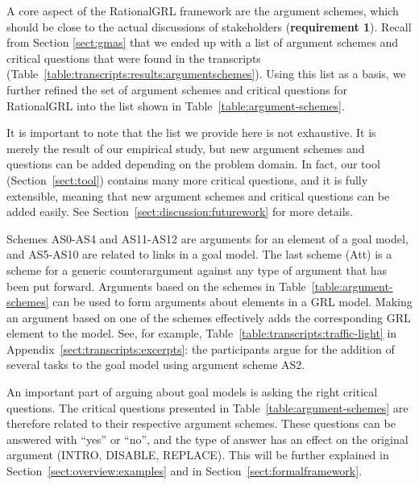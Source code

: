 A core aspect of the RationalGRL framework are the argument schemes, which should be close to the actual discussions of stakeholders (\textbf{requirement 1}). Recall from Section \ref{sect:gmas} that we ended up with a list of argument schemes and critical questions that were found in the transcripts (Table~\ref{table:transcripts:results:argumentschemes}). Using this list as a basis, we further refined the set of argument schemes and critical questions for RationalGRL into the list shown in Table~\ref{table:argument-schemes}. 

It is important to note that the list we provide here is not exhaustive. It is merely the result of our empirical study, but new argument schemes and questions can be added depending on the problem domain. In fact, our tool (Section~\ref{sect:tool}) contains many more critical questions, and it is fully extensible, meaning that new argument schemes and critical questions can be added easily. See Section~\ref{sect:discussion:futurework} for more details.

Schemes AS0-AS4 and AS11-AS12 are arguments for an element of a goal model, and AS5-AS10 are related to links in a goal model. The last scheme (Att) is a scheme for a generic counterargument against any type of argument that has been put forward. Arguments based on the schemes in Table~\ref{table:argument-schemes} can be used to form arguments about elements in a GRL model. Making an argument based on one of the schemes effectively adds the corresponding GRL element to the model. See, for example, Table~\ref{table:transcripts:traffic-light} in Appendix~\ref{sect:transcripts:excerpts}: the participants argue for the addition of several tasks to the goal model using argument scheme AS2. 

An important part of arguing about goal models is asking the right critical questions. The critical questions presented in Table~\ref{table:argument-schemes} are therefore related to their respective argument schemes. These questions can be answered with ``yes'' or ``no'', and the type of answer has an effect on the original argument (\textsf{INTRO}, \textsf{DISABLE}, \textsf{REPLACE}). This will be further explained in Section~\ref{sect:overview:examples} and in Section~\ref{sect:formalframework}.


